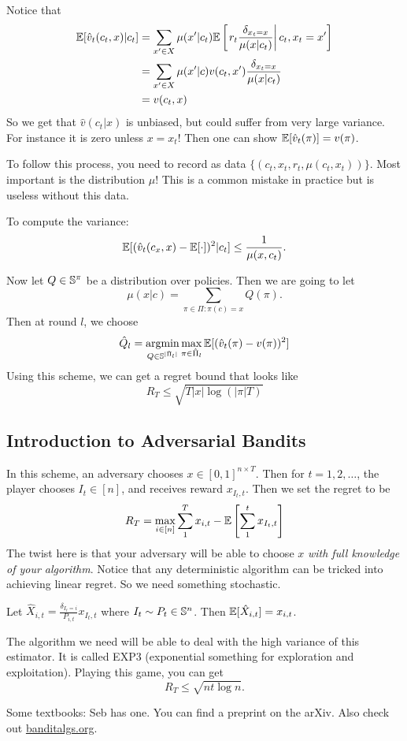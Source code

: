 \documentclass[12pt]{article}
\DeclareMathOperator*{\argmin}{argmin}
\begin{document}
Notice that 
\begin{align*}
	\mathbb{E}[\hat v_t(c_t,x)|c_t] &= \sum_{x'\in X}\mu(x'|c_t)\mathbb{E}\left[\left.r_t\frac{\delta_{x_t=x}}{\mu(x|c_t)}\right| c_t,x_t=x'\right]\\
	&=\sum_{x'\in X}\mu(x'|c)v(c_t,x')\frac{\delta_{x_t=x}}{\mu(x|c_t)}\\
	&=v(c_t,x)
\end{align*}
So we get that $\hat v(c_t|x)$ is unbiased, but could suffer from very large variance. For instance it is zero unless $x=x_t$!
Then one can show $\mathbb{E}[\hat v_t(\pi)]=v(\pi)$.
\begin{rmk}
	To follow this process, you need to record as data $\{(c_t,x_t,r_t,\mu(c_t,x_t))\}$. Most important is the distribution $\mu$! This is a common mistake in practice but is useless without this data.
\end{rmk}

To compute the variance:
\[\mathbb{E}[(\hat v_t(c_x,x)-\mathbb{E}[\cdot])^2|c_t]\le\frac{1}{\mu(x,c_t)}.\]

Now let $Q\in \mathbb{S}^{\pi}$ be a distribution over policies. Then we are going to let 
\[\mu(x|c)=\sum_{\pi\in\Pi:\pi(c)=x}Q(\pi).\]
Then at round $l$, we choose 
\[\hat Q_l=\argmin_{Q\in\bbS^{|\hat\Pi_l|}}\max_{\pi\in\hat\Pi_l}\bbE[(\hat v_t(\pi)-v(\pi))^2]\]
Using this scheme, we can get a regret bound that looks like 
\[R_T\le\sqrt{T|x|\log(|\pi|T)}\]
\subsection{Introduction to Adversarial Bandits}
In this scheme, an adversary chooses $x\in[0,1]^{n\times T}$. Then for $t=1,2,\dots$, the player chooses $I_t\in[n]$, and receives reward $x_{I_t,t}$.
Then we set the regret to be 
\[R_T=\max_{i\in[n]}\sum_1^Tx_{i,t}-\mathbb{E}\left[\sum_1^t x_{I_t,t}\right]\]
The twist here is that your adversary will be able to choose $x$ \textit{with full knowledge of your algorithm}. Notice that any deterministic algorithm can be tricked into achieving linear regret. So we need something stochastic.

Let $\hat X_{i,t}=\frac{\delta_{I_t=i}}{P_{i,t}}x_{I_t,t}$ where $I_t\sim P_t\in\mathbb{S}^n$. Then $\mathbb{E}[\hat X_{i,t}]=x_{i,t}$.

The algorithm we need will be able to deal with the high variance of this estimator. It is called EXP3 (exponential something for exploration and exploitation). Playing this game, you can get 
\[R_T\le\sqrt{nt\log n}.\]

Some textbooks: Seb has one. You can find a preprint on the arXiv. Also check out \href{banditalgs.org}{banditalgs.org}.
\end{document}
